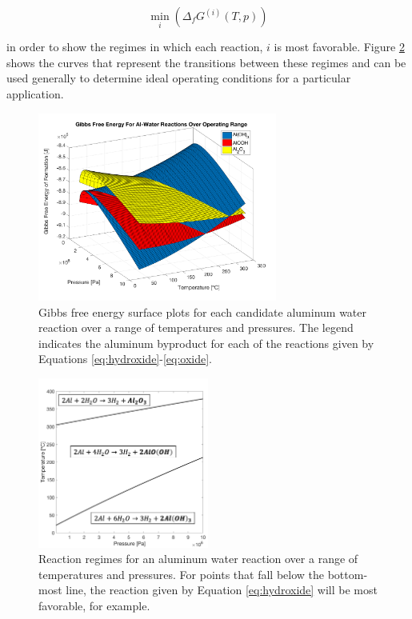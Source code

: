 \documentclass[preprint,12pt,3p]{elsarticle}
\begin{document}
\begin{equation}
  \min_i(\Delta_fG^{(i)}(T,p))
  \label{eq:min_gibbs}
\end{equation}

\noindent in order to show the regimes in which each reaction, $i$ is most
favorable.  Figure \ref{fig:transitions} shows the curves that represent the
transitions between these regimes and can be used generally to determine ideal
operating conditions for a particular application.

\begin{figure}
  \centering
  \includegraphics[width=0.7\textwidth]{fig/gibbs_total_surface}
  \caption{Gibbs free energy surface plots for each candidate aluminum water
  reaction over a range of temperatures and pressures. The legend indicates the
  aluminum byproduct for each of the reactions given by Equations
\ref{eq:hydroxide}-\ref{eq:oxide}.}
  \label{fig:gibbs_surface}
\end{figure}

\begin{figure}
  \centering
  \includegraphics[width=0.5\textwidth]{fig/transitions}
  \caption{Reaction regimes for an aluminum water reaction over a range of
  temperatures and pressures. For points that fall below the bottom-most line,
the reaction given by Equation \ref{eq:hydroxide} will be most favorable, for
example.}
  \label{fig:transitions}
\end{figure}
\end{document}
